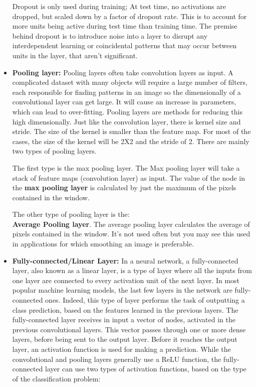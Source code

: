 \begin{itemize}
    Dropout is only used during training; At test time, no activations are dropped, but scaled down by a factor of dropout rate. This is to account for more units being active during test time than training time. The premise behind dropout is to introduce noise into a layer to disrupt any interdependent learning or coincidental patterns that may occur between units in the layer, that aren’t significant. \\
    \item \textbf{Pooling layer: }Pooling layers often take convolution layers as input. A complicated dataset with many objects will require a large number of filters, each responsible for finding patterns in an image so the dimensionally of a convolutional layer can get large. It will cause an increase in parameters, which can lead to over-fitting. Pooling layers are methods for reducing this high dimensionally. Just like the convolution layer, there is kernel size and stride. The size of the kernel is smaller than the feature map. For most of the cases, the size of the kernel will be 2X2 and the stride of 2. There are mainly two types of pooling layers.

    The first type is the max pooling layer. The Max pooling layer will take a stack of feature maps (convolution layer) as input. The value of the node in the \textbf{max pooling layer} is calculated by just the maximum of the pixels contained in the window.
    
    The other type of pooling layer is the: \\
    \textbf{Average Pooling layer}. The average pooling layer calculates the average of pixels contained in the window. It's not used often but you may see this used in applications for which smoothing an image is preferable.\\
    \item \textbf{Fully-connected/Linear Layer: } In a neural network, a fully-connected layer, also known as a linear layer, is a type of layer where all the inputs from one layer are connected to every activation unit of the next layer. In most popular machine learning models, the last few layers in the network are fully-connected ones. Indeed, this type of layer performs the task of outputting a class prediction, based on the features learned in the previous layers.
    The fully-connected layer receives in input a vector of nodes, activated in the previous convolutional layers. This vector passes through one or more dense layers, before being sent to the output layer. Before it reaches the output layer, an activation function is used for making a prediction. While the convolutional and pooling layers generally use a ReLU function, the fully-connected layer can use two types of activation functions, based on the type of the classification problem:
    

\end{itemize}

